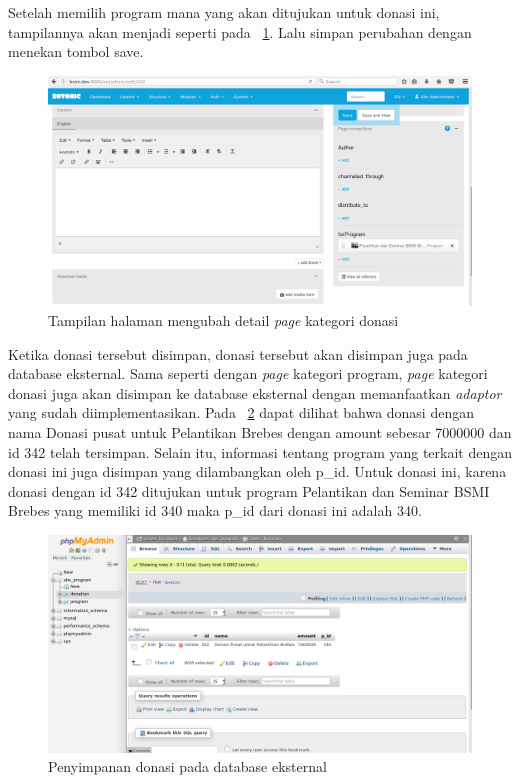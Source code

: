 Setelah memilih program mana yang akan ditujukan untuk donasi ini, tampilannya akan menjadi seperti pada \pic~\ref{fig:editdonation5}. Lalu simpan perubahan dengan menekan tombol save.
\begin{figure}
	\centering
	\includegraphics[width=1\textwidth]
	{pics/11-editDonation5.png}
	\caption{Tampilan halaman mengubah detail \textit{page} kategori donasi}
	\label{fig:editdonation5}
\end{figure}
\vspace{-0.3cm}

Ketika donasi tersebut disimpan, donasi tersebut akan disimpan juga pada database eksternal. Sama seperti dengan \textit{page} kategori program, \textit{page} kategori donasi juga akan disimpan ke database eksternal dengan memanfaatkan \textit{adaptor} yang sudah diimplementasikan. Pada \pic~\ref{fig:savedonation} dapat dilihat bahwa donasi dengan nama Donasi pusat untuk Pelantikan Brebes dengan amount sebesar 7000000 dan id 342 telah tersimpan. Selain itu, informasi tentang program yang terkait dengan donasi ini juga disimpan yang dilambangkan oleh p\_id. Untuk donasi ini, karena donasi dengan id 342 ditujukan untuk program Pelantikan dan Seminar BSMI Brebes yang memiliki id 340 maka p\_id dari donasi ini adalah 340.
\begin{figure}
	\centering
	\includegraphics[width=1\textwidth]
	{pics/12-saveDonation.png}
	\caption{Penyimpanan donasi pada database eksternal}
	\label{fig:savedonation}
\end{figure}
\vspace{-0.3cm}

